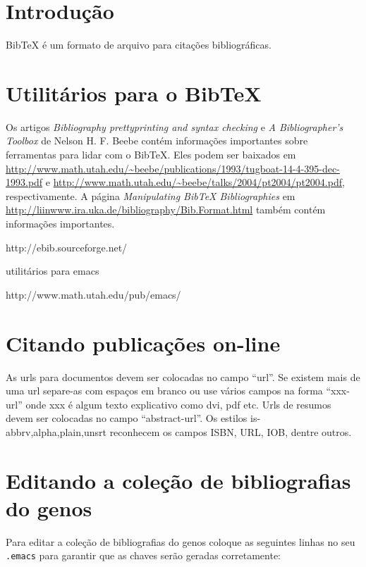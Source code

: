 \documentclass[12pt,brazil]{book}
\begin{document}
\section{Introdução}
\label{sec:introducao-1}

BibTeX é um formato de arquivo para citações bibliográficas.

\section{Utilitários para o BibTeX}
\label{sec:utilitarios-para-o}

Os artigos \textit{Bibliography prettyprinting and syntax checking} e
\textit{A Bibliographer's Toolbox} de Nelson H. F. Beebe contém
informações importantes sobre ferramentas para lidar com o BibTeX.
Eles podem ser baixados em
\url{http://www.math.utah.edu/~beebe/publications/1993/tugboat-14-4-395-dec-1993.pdf}
 e \url{http://www.math.utah.edu/~beebe/talks/2004/pt2004/pt2004.pdf},
respectivamente. A página \textit{Manipulating BibTeX Bibliographies}
em \url{http://liinwww.ira.uka.de/bibliography/Bib.Format.html} também
contém informações importantes.

http://ebib.sourceforge.net/

utilitários para emacs

http://www.math.utah.edu/pub/emacs/

\section{Citando publicações on-line}
\label{sec:citando-publ-line}

As urls para documentos devem ser colocadas no campo ``url''. Se
existem mais de uma url separe-as com espaços em branco ou use vários
campos na forma ``xxx-url'' onde xxx é algum texto explicativo como
dvi, pdf etc. Urls de resumos devem ser colocadas no campo
``abstract-url''. Os estilos is-{abbrv,alpha,plain,unsrt} reconhecem
os campos ISBN, URL, IOB, dentre outros.

\section{Editando a coleção de bibliografias do genos}
\label{sec:editando-colecao-de}

Para editar a coleção de bibliografias do genos coloque as seguintes
linhas no seu \texttt{.emacs} para garantir que as chaves serão
geradas corretamente:
\end{document}
